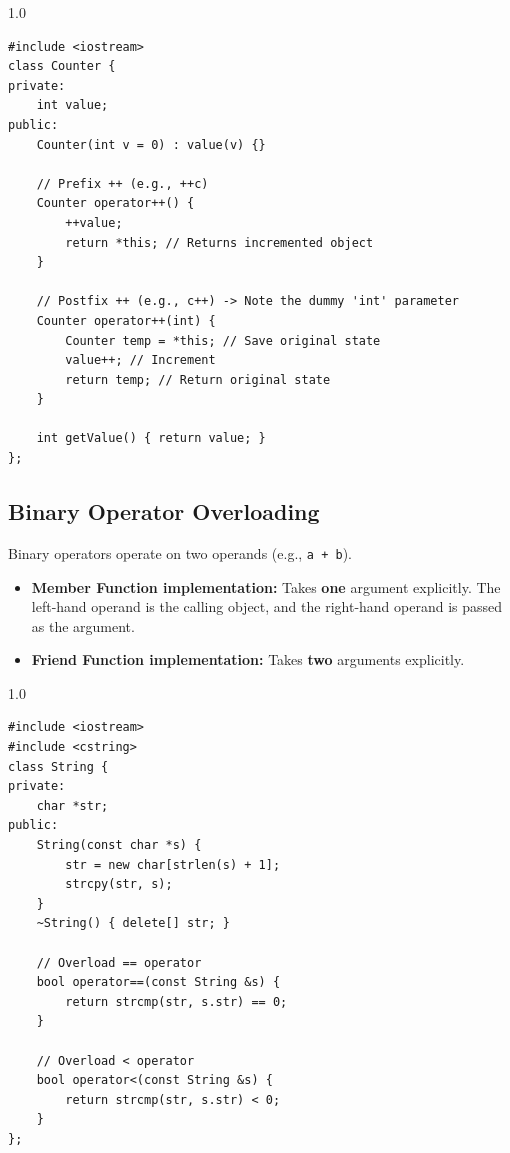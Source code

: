 \documentclass[12pt,a4paper]{article}
\begin{document}
\begin{tcolorbox}[examplebox, title={Code Example: Prefix and Postfix operator overloading}]
\begin{spacing}{1.0}
\begin{verbatim}
#include <iostream>
class Counter {
private:
    int value;
public:
    Counter(int v = 0) : value(v) {}
    
    // Prefix ++ (e.g., ++c)
    Counter operator++() {
        ++value;
        return *this; // Returns incremented object
    }
    
    // Postfix ++ (e.g., c++) -> Note the dummy 'int' parameter
    Counter operator++(int) {
        Counter temp = *this; // Save original state
        value++; // Increment
        return temp; // Return original state
    }
    
    int getValue() { return value; }
};
\end{verbatim}
\end{spacing}
\end{tcolorbox}

\subsection{Binary Operator Overloading}
Binary operators operate on two operands (e.g., \texttt{a + b}).
\begin{itemize}[leftmargin=*, itemsep=3pt]
  \item \textbf{Member Function implementation:} Takes \textbf{one} argument explicitly. The left-hand operand is the calling object, and the right-hand operand is passed as the argument.
  \item \textbf{Friend Function implementation:} Takes \textbf{two} arguments explicitly.
\end{itemize}

\begin{tcolorbox}[examplebox, title={Code Example: Relational operator overloading for custom strings}]
\begin{spacing}{1.0}
\begin{verbatim}
#include <iostream>
#include <cstring>
class String {
private:
    char *str;
public:
    String(const char *s) {
        str = new char[strlen(s) + 1];
        strcpy(str, s);
    }
    ~String() { delete[] str; }
    
    // Overload == operator
    bool operator==(const String &s) {
        return strcmp(str, s.str) == 0;
    }
    
    // Overload < operator
    bool operator<(const String &s) {
        return strcmp(str, s.str) < 0;
    }
};
\end{verbatim}
\end{spacing}
\end{tcolorbox}
\end{document}
